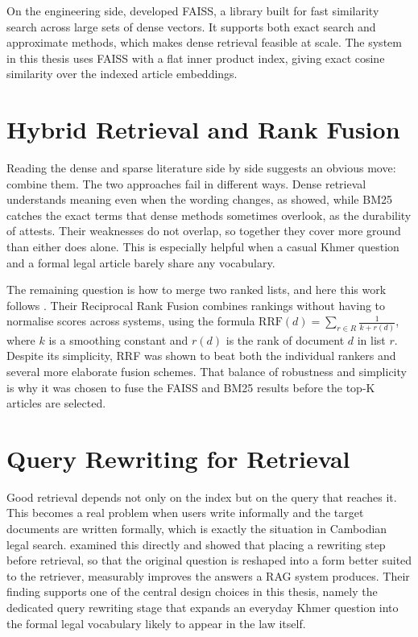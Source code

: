 \hs On the engineering side, \citet{johnson2021faiss} developed FAISS, a library built
for fast similarity search across large sets of dense vectors. It supports both exact
search and approximate methods, which makes dense retrieval feasible at scale. The system
in this thesis uses FAISS with a flat inner product index, giving exact cosine similarity
over the indexed article embeddings.

\section{Hybrid Retrieval and Rank Fusion}

\hs Reading the dense and sparse literature side by side suggests an obvious move:
combine them. The two approaches fail in different ways. Dense retrieval understands
meaning even when the wording changes, as \citet{karpukhin2020dpr} showed, while BM25
catches the exact terms that dense methods sometimes overlook, as the durability of
\citet{robertson2009bm25} attests. Their weaknesses do not overlap, so together they
cover more ground than either does alone. This is especially helpful when a casual Khmer
question and a formal legal article barely share any vocabulary.

\hs The remaining question is how to merge two ranked lists, and here this work follows
\citet{cormack2009rrf}. Their Reciprocal Rank Fusion combines rankings without having to
normalise scores across systems, using the formula
$\text{RRF}(d) = \sum_{r \in R} \frac{1}{k + r(d)}$, where $k$ is a smoothing constant
and $r(d)$ is the rank of document $d$ in list $r$. Despite its simplicity, RRF was shown
to beat both the individual rankers and several more elaborate fusion schemes. That
balance of robustness and simplicity is why it was chosen to fuse the FAISS and BM25
results before the top-K articles are selected.

\section{Query Rewriting for Retrieval}

\hs Good retrieval depends not only on the index but on the query that reaches it. This
becomes a real problem when users write informally and the target documents are written
formally, which is exactly the situation in Cambodian legal search.
\citet{ma2023queryrewriting} examined this directly and showed that placing a rewriting
step before retrieval, so that the original question is reshaped into a form better suited
to the retriever, measurably improves the answers a RAG system produces. Their finding
supports one of the central design choices in this thesis, namely the dedicated query
rewriting stage that expands an everyday Khmer question into the formal legal vocabulary
likely to appear in the law itself.

